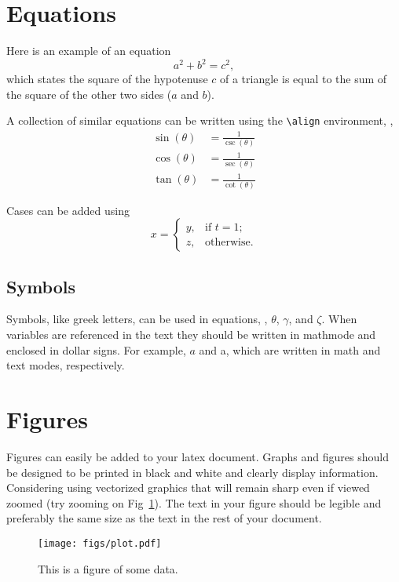 
\section{Equations}\label{Sect:eqns}
Here is an example of an equation
\begin{equation}\label{eq:pyth}
  a^2+b^2=c^2,
\end{equation}
which states the square of the hypotenuse $c$ of a triangle is equal to the sum of the square of the other two sides ($a$ and $b$). 

A collection of similar equations can be written using the \verb|\align| environment, \eg, 
\begin{align}\label{eq:trig}
  \sin(\theta) &= \frac{1}{\csc(\theta)}\\
  \cos(\theta) &= \frac{1}{\sec(\theta)}\\
  \tan(\theta) &= \frac{1}{\cot(\theta)}
\end{align}

Cases can be added using
\begin{equation}
  x = \begin{cases}
    y, & \text{if $t = 1$;} \\
    z, & \text{otherwise.}
  \end{cases}
\end{equation}

\subsection{Symbols}\label{Sect:sym}
Symbols, like greek letters, can be used in equations, \eg, $\theta$, $\gamma$, and $\zeta$.  When variables are referenced in the text they should be written in mathmode and enclosed in dollar signs.  For example, $a$ and a, which are written in math and text modes, respectively.

\section{Figures}\label{Sect:figs}
Figures can easily be added to your latex document.  Graphs and figures should be designed to be printed in black and white and clearly display information.  Considering using vectorized graphics that will remain sharp even if viewed zoomed (try zooming on Fig~\ref{fig:plot}).  The text in your figure should be legible and preferably the same size as the text in the rest of your document.

\begin{figure}[htbp]
  \centering
  \texttt{[image: figs/plot.pdf]}
  \caption{This is a figure of some data.}
  \label{fig:plot}
\end{figure}


